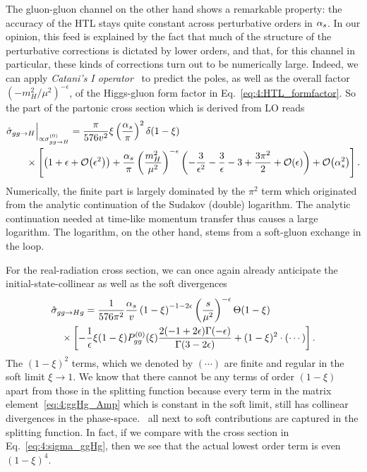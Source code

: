 The gluon-gluon channel on the other hand shows a remarkable property: the accuracy of the \acs{HTL} stays quite constant across perturbative orders in $\alpha_s$. In our opinion, this feed is explained by the fact that much of the structure of the perturbative corrections is dictated by lower orders, and that, for this channel in particular, these kinds of corrections turn out to be numerically large. Indeed, we can apply \textit{Catani's I operator}~\cite{Catani:1996vz} to predict the poles, as well as the overall factor $(-m_H^2/\mu^2)^{-\epsilon}$, of the Higgs-gluon form factor in Eq.~\eqref{eq:4:HTL_formfactor}. So the part of the partonic cross section which is derived from \acs{LO} reads
\begin{equation}
\begin{split}
&\hat{\sigma}_{gg \rightarrow H} \Big \vert_{\propto \sigma_{gg \rightarrow H}^{(0)}} = \frac{\pi}{576 v^2} \xi  \left(\frac{\alpha_s}{\pi} \right)^2 \delta(1 - \xi) \\
&\qquad \times \left[ \left( 1 + \epsilon + \mathcal{O}\!\left(\epsilon^2\right) \right) + \frac{\alpha_s}{\pi} \left(\frac{m_H^2}{\mu^2} \right)^{-\epsilon} \left(-\frac{3}{\epsilon^2} - \frac{3}{\epsilon} - 3 + \frac{3 \pi^2}{2} + \mathcal{O}\!\left(\epsilon\right) \right) + \mathcal{O}\!\left(\alpha_s^2\right) \right].
\end{split}
\label{eq:4:ggH_xSec_propto_LO}
\end{equation}
Numerically, the finite part is largely dominated by the $\pi^2$ term which originated from the analytic continuation of the Sudakov (double) logarithm. The analytic continuation needed at time-like momentum transfer thus causes a large logarithm. The logarithm, on the other hand, stems from a soft-gluon exchange in the loop.

For the real-radiation cross section, we can once again already anticipate the initial-state-collinear as well as the soft divergences
\begin{equation}
  \begin{split}
  & \hat{\sigma}_{gg \rightarrow H g} = \frac{1}{576 \pi^2} \frac{\alpha_s}{v} \left(1 - \xi \right)^{-1 - 2 \epsilon} \left( \frac{s}{\mu^2} \right)^{-\epsilon} \Theta (1 - \xi) \\
  & \quad \times \left[ - \frac{1}{\epsilon} \xi (1 - \xi) P_{gg}^{(0)}(\xi) \frac{2 (-1 + 2 \epsilon) \Gamma (-\epsilon)}{\Gamma (3 - 2 \epsilon)} +  (1 - \xi)^2 \cdot (\cdots)  \right].
  \end{split}
\end{equation}
The $(1 - \xi)^2$ terms, which we denoted by $(\cdots)$ are finite and regular in the soft limit $\xi \rightarrow 1$. We know that there cannot be any terms of order $(1 - \xi)$ apart from those in the splitting function because every term in the matrix element~\eqref{eq:4:ggHg_Amp} which is constant in the soft limit, still has collinear divergences in the phase-space. \Ie\ all next to soft contributions are captured in the splitting function. In fact, if we compare with the cross section in Eq.~\eqref{eq:4:sigma_ggHg}, then we see that the actual lowest order term is even $(1 - \xi)^4$.

